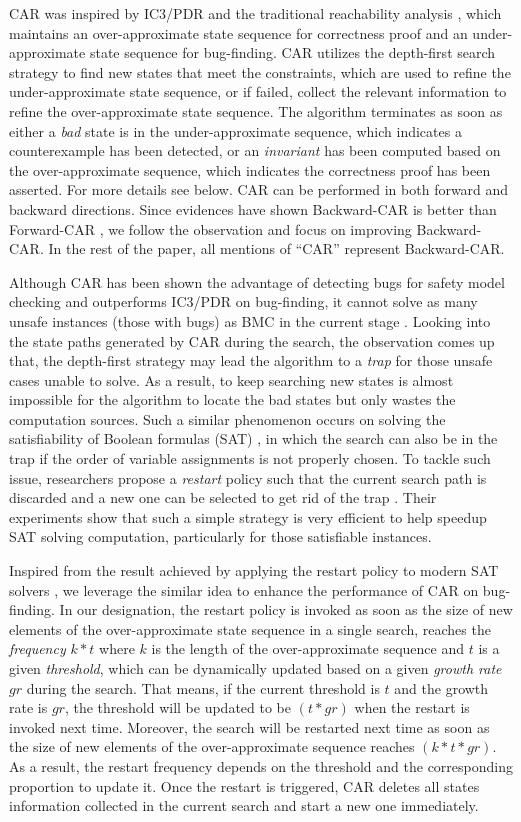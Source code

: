 CAR was inspired by IC3/PDR and the traditional reachability analysis \cite{LZZPV17}, which maintains an over-approximate state sequence for correctness proof and an under-approximate state sequence for bug-finding. CAR utilizes the depth-first search strategy to find new states that meet the constraints, which are used to refine the under-approximate state sequence, or if failed, collect the relevant  information to refine the over-approximate state sequence. The algorithm terminates as soon as either a \emph{bad} state is in the under-approximate sequence, which indicates a counterexample has been detected, or an \emph{invariant} has been computed based on the over-approximate sequence, which indicates the correctness proof has been asserted.  For more details see below. CAR can be performed in both forward and backward directions. Since evidences have shown Backward-CAR is better than Forward-CAR \cite{LDPRV18}, we follow the observation and focus on improving Backward-CAR. In the rest of the paper, all mentions of ``CAR'' represent Backward-CAR. 

Although CAR has been shown the advantage of detecting bugs for safety model checking and outperforms IC3/PDR on bug-finding, it cannot solve as many unsafe instances (those with bugs) as BMC in the current stage \cite{DLPVR19}. Looking into the state paths generated by CAR during the search, the observation comes up that, the depth-first strategy may lead the algorithm to a \emph{trap} for those unsafe cases unable to solve. As a result, to keep searching new states is almost impossible for the algorithm to locate the bad states but only wastes the computation sources. Such a similar phenomenon occurs on solving the satisfiability of Boolean formulas (SAT) \cite{VWM15}, in which the search can also be in the trap if the order of variable assignments is not properly chosen. To tackle such issue, researchers propose a \emph{restart} policy such that the current search path is discarded and a new one can be selected to get rid of the trap \cite{Biere08}. Their experiments show that such a simple strategy is very efficient to help speedup  SAT solving computation, particularly for those satisfiable instances. 

Inspired from the result achieved by applying the restart policy to modern SAT solvers \cite{Biere08}, we leverage the similar idea to enhance the performance of CAR on bug-finding. In our designation, the restart policy is invoked as soon as the size of new elements of the over-approximate state sequence in a single search, reaches the \emph{frequency} $k*t$ where $k$ is the length of the over-approximate sequence and $t$ is a given  \emph{threshold}, which can be dynamically updated based on a given \emph{growth rate} $gr$ during the search. That means, if the current threshold is $t$ and the growth rate is $gr$, the threshold will be updated to be $(t*gr)$ when the restart is invoked next time. Moreover, the search will be restarted next time as soon as the size of new elements of the over-approximate sequence reaches $(k*t*gr)$. As a result, the restart frequency depends on the threshold and the corresponding proportion to update it. Once the restart is triggered, CAR deletes all states information collected in the current search and start a new one immediately. 


